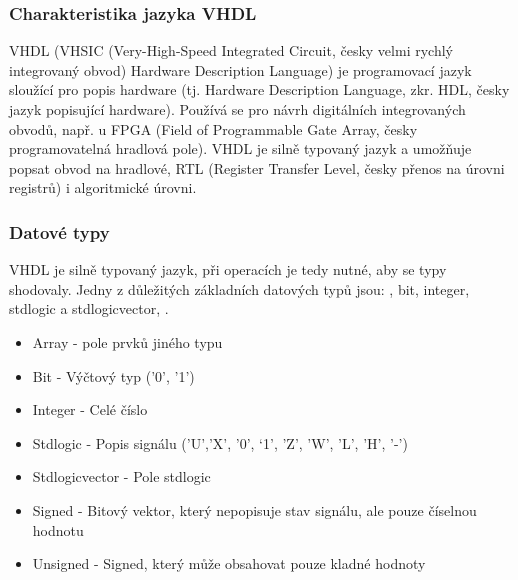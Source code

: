 \documentclass{report}
\begin{document}
\subsubsection{Charakteristika jazyka VHDL}
VHDL (VHSIC (Very-High-Speed Integrated Circuit, česky velmi rychlý integrovaný obvod) Hardware Description Language) je programovací jazyk sloužící pro popis hardware (tj. Hardware Description Language, zkr. HDL, česky jazyk popisující hardware). Používá se pro návrh digitálních integrovaných obvodů, např. u FPGA (Field of Programmable Gate Array, česky programovatelná hradlová pole). VHDL je silně typovaný jazyk a umožňuje popsat obvod na hradlové, RTL (Register Transfer Level, česky přenos na úrovni registrů) i algoritmické úrovni.
\subsubsection{Datové typy}
VHDL je silně typovaný jazyk, při operacích je tedy nutné, aby se typy shodovaly. Jedny z důležitých základních datových typů jsou: , bit, integer, std\textunderscore logic a std\textunderscore logic\textunderscore vector, . 
\begin{itemize}
  \item Array - pole prvků jiného typu
  \item Bit - Výčtový typ ('0', '1')
  \item Integer - Celé číslo
  \item Std\textunderscore logic - Popis signálu ('U’,'X', '0',  ‘1', 'Z', 'W',  'L', 'H', '-')
  \item Std\textunderscore logic\textunderscore vector - Pole std\textunderscore logic
  \item Signed - Bitový vektor, který nepopisuje stav signálu, ale pouze číselnou hodnotu
  \item Unsigned - Signed, který může obsahovat pouze kladné hodnoty
\end{itemize}
\end{document}
